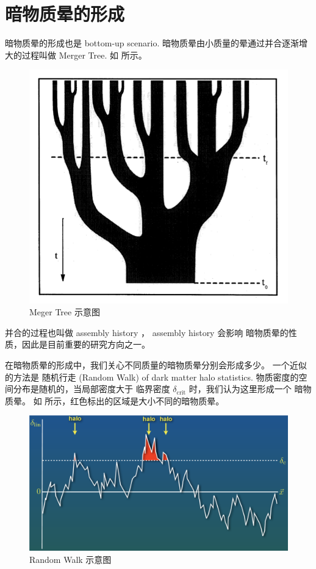 \section{暗物质晕的形成}

暗物质晕的形成也是 bottom-up scenario.
暗物质晕由小质量的晕通过并合逐渐增大的过程叫做 
Merger Tree. 如  所示。

\begin{figure}[!hbtp]
	\centering 
	\includegraphics[width=1.0\linewidth]{MegerTree.png}
	\caption{Meger Tree 示意图}
    \label{fig:MegerTree}
\end{figure}

并合的过程也叫做 assembly history ，
assembly history 会影响 暗物质晕的性质，因此是目前重要的研究方向之一。

在暗物质晕的形成中，我们关心不同质量的暗物质晕分别会形成多少。
一个近似的方法是
随机行走 (Random Walk) of dark matter halo statistics.
物质密度的空间分布是随机的，当局部密度大于 临界密度 $\delta_\text{crit}$ 时，我们认为这里形成一个 暗物质晕。 如  所示，红色标出的区域是大小不同的暗物质晕。

\begin{figure}[!hbtp]
	\centering 
	\includegraphics[width=1.0\linewidth]{Peaks_halo.png}
	\caption{Random Walk 示意图}
    \label{fig:RandomWalk}
\end{figure}

